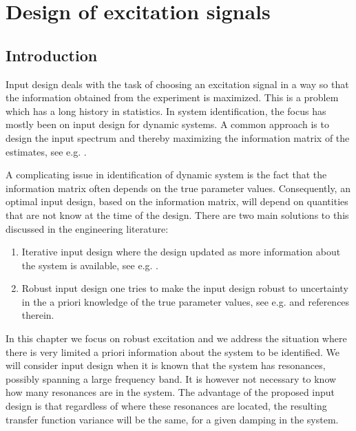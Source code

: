 \chapter{Design of excitation signals}
\label{sec:excitation}
\def\thisDir{ch02-qlogms}

\section{Introduction}
\label{sec:excitation:intro}
Input design deals with the task of choosing an excitation signal in a way so that the information obtained from the experiment is maximized. 
This is a problem which has a long history in statistics. 
In system identification, the focus has mostly been on input design for dynamic systems.
A common approach is to design the input spectrum and thereby maximizing the information matrix of the estimates, see e.g. \cite{Fedorov1972,Goodwin1977}.

A complicating issue in identification of dynamic system is the fact that the information matrix often depends on the true parameter values. 
Consequently, an optimal input design, based on the information matrix, will depend on quantities that are not know at the time of the design. 
There are two main solutions to this discussed in the engineering literature:
\begin{enumerate}
\item Iterative input design where the design updated as more information about the system is available, see e.g. \cite{Hjalmarsson2005,Gevers2005}.
\item Robust input design one tries to make the input design robust to uncertainty in the a priori knowledge of the true parameter values, see e.g. \cite{Rojas2007} and references therein. 
\end{enumerate}

In this chapter we focus on robust excitation and we address the situation where there is very limited a priori information about the system to be identified. 
We will consider input design when it is known that the system has resonances, possibly spanning a large frequency band. 
It is however not necessary to know how many resonances are in the system. 
The advantage of the proposed input design is that regardless of where these resonances are located, the resulting transfer function variance will be the same, for a given damping in the system.

